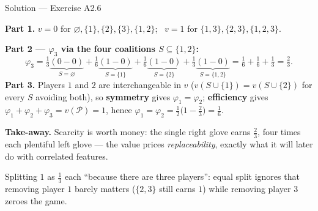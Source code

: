 \documentclass[aspectratio=169,11pt]{beamer}
\begin{document}
\begin{frame}{Solution --- Exercise A2.6}
\begin{solutionbox}
  \textbf{Part 1.} $v=0$ for $\varnothing,\{1\},\{2\},\{3\},\{1,2\}$; \
  $v=1$ for $\{1,3\},\{2,3\},\{1,2,3\}$.

  \smallskip
  \textbf{Part 2 --- $\varphi_3$ via the four coalitions $S\subseteq\{1,2\}$:}
  \[
    \varphi_3 = \tfrac13\underbrace{(0-0)}_{S=\varnothing}
              + \tfrac16\underbrace{(1-0)}_{S=\{1\}}
              + \tfrac16\underbrace{(1-0)}_{S=\{2\}}
              + \tfrac13\underbrace{(1-0)}_{S=\{1,2\}}
    = \tfrac16+\tfrac16+\tfrac13 = \tfrac{2}{3}.
  \]
  \textbf{Part 3.} Players $1$ and $2$ are interchangeable in $v$
  ($v(S\cup\{1\})=v(S\cup\{2\})$ for every $S$ avoiding both), so
  \textbf{symmetry} gives $\varphi_1=\varphi_2$; \textbf{efficiency} gives
  $\varphi_1+\varphi_2+\varphi_3 = v(\mathcal{P})=1$, hence
  $\varphi_1=\varphi_2=\tfrac{1}{2}\bigl(1-\tfrac23\bigr)=\tfrac16$.

  \smallskip
  \textbf{Take-away.} Scarcity is worth money: the single right glove earns
  $\tfrac23$, four times each plentiful left glove --- the value prices
  \emph{replaceability}, exactly what it will later do with correlated features.
\end{solutionbox}
\begin{mistake}
  Splitting $1$ as $\tfrac13$ each ``because there are three players'': equal split
  ignores that removing player $1$ barely matters ($\{2,3\}$ still earns $1$) while
  removing player $3$ zeroes the game.
\end{mistake}
\end{frame}
\end{document}
